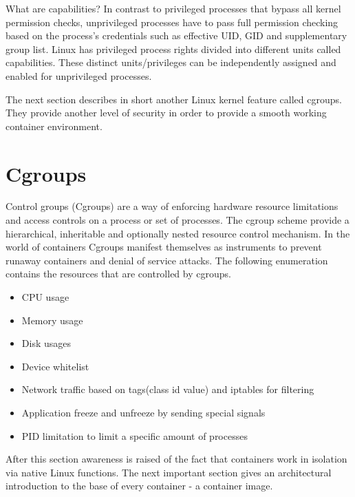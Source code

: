 What are capabilities? In contrast to privileged processes that bypass all kernel permission checks, unprivileged processes have to pass full permission checking based on the process’s credentials such as effective UID, GID and supplementary group list. Linux has privileged process rights divided into different units called capabilities. These distinct units/privileges can be independently assigned and enabled for unprivileged processes.

The next section describes in short another Linux kernel feature called cgroups. They provide another level of security in order to provide a smooth working container environment.

\section{Cgroups}
\label{sec:intro:containerization:cgroups}
Control groups (Cgroups) are a way of enforcing hardware resource limitations and access controls on a process or set of processes. The cgroup scheme provide a hierarchical, inheritable and optionally nested resource control mechanism.
In the world of containers Cgroups manifest themselves as instruments to prevent runaway containers and denial of service attacks.
The following enumeration contains the resources that are controlled by cgroups.
\begin{itemize}
\item CPU usage
\item Memory usage
\item Disk usages
\item Device whitelist
\item Network traffic based on tags(class id value) and iptables for filtering
\item Application freeze and unfreeze by sending special signals
\item PID limitation to limit a specific amount of processes 
\end{itemize}

After this section awareness is raised of the fact that containers work in isolation via native Linux functions.
The next important section gives an architectural introduction to the base of every container - a container image.
